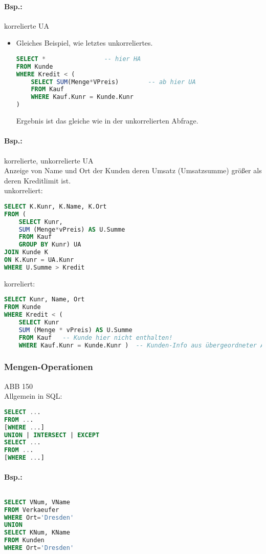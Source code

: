 \paragraph{Bsp.:} korrelierte UA
\begin{itemize}
\item Gleiches Beispiel, wie letztes unkorreliertes.
\begin{lstlisting}[language=SQL]
SELECT * 				-- hier HA
FROM Kunde 
WHERE Kredit < (
	SELECT SUM(Menge*VPreis)		-- ab hier UA
	FROM Kauf
	WHERE Kauf.Kunr = Kunde.Kunr
)
\end{lstlisting}
Ergebnis ist das gleiche wie in der unkorrelierten Abfrage.
\end{itemize}

\paragraph{Bsp.:} korrelierte, unkorrelierte UA\\
Anzeige von Name und Ort der Kunden deren Umsatz (Umsatzsumme) größer als deren Kreditlimit ist.\\
unkorreliert:
\begin{lstlisting}[language=SQL]
SELECT K.Kunr, K.Name, K.Ort
FROM (
	SELECT Kunr,
	SUM (Menge*vPreis) AS U.Summe
	FROM Kauf
	GROUP BY Kunr) UA
JOIN Kunde K
ON K.Kunr = UA.Kunr
WHERE U.Summe > Kredit
\end{lstlisting}
korreliert:
\begin{lstlisting}[language=SQL]
SELECT Kunr, Name, Ort
FROM Kunde
WHERE Kredit < (
	SELECT Kunr
	SUM (Menge * vPreis) AS U.Summe
	FROM Kauf	-- Kunde hier nicht enthalten!
	WHERE Kauf.Kunr = Kunde.Kunr )	-- Kunden-Info aus übergeordneter Abfrage
\end{lstlisting}

\subsubsection{Mengen-Operationen}
ABB 150\\
Allgemein in SQL:
\begin{lstlisting}[language=SQL]
SELECT ...
FROM ...
[WHERE ...]
UNION | INTERSECT | EXCEPT
SELECT ...
FROM ...
[WHERE ...]
\end{lstlisting}
\paragraph{Bsp.:}$ $
\begin{lstlisting}[language=SQL]
SELECT VNum, VName
FROM Verkaeufer
WHERE Ort='Dresden'
UNION
SELECT KNum, KName
FROM Kunden
WHERE Ort='Dresden'
\end{lstlisting}

